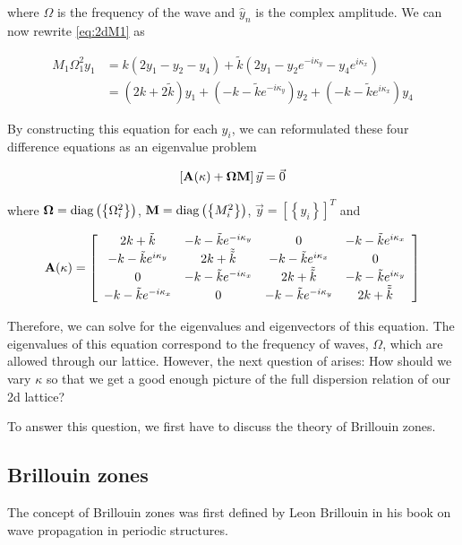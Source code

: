 where $\Omega$ is the frequency of the wave and $\hat{y}_{n}$ is the complex
amplitude. We can now rewrite \eqref{eq:2dM1} as

\begin{align}
  M_1\Omega_1^{2}y_1
      &=k\left(2y_1-y_2-y_4\right)+
       \tilde{k}\left(2y_1-y_{2}e^{-i\kappa_y}-y_{4}e^{i\kappa_x}\right) \\
      &=\left(2k+2\tilde{k}\right)y_1+\left(-k-\tilde{k}e^{-i\kappa_y}\right)y_2+
       \left(-k-\tilde{k}e^{i\kappa_x}\right)y_4
\end{align}

By constructing this equation for each $y_i$, we can reformulated these four
difference equations as an eigenvalue problem

\begin{align}
  \left[\mathbf{A(\kappa)}+\mathbf{\Omega}\mathbf{M}\right]\vec{y}=\vec{0}
\end{align}

where $\mathbf{\Omega}=\operatorname{diag}\left(\left\{\Omega_i^2\right\}\right)$,
$\mathbf{M}=\operatorname{diag}\left(\left\{M_i^2\right\}\right)$,
$\vec{y}=\left[\left\{y_i\right\}\right]^T$ and

\begin{align}
  \mathbf{A(\kappa)}=\left[
\begin{array}{cccc}
2k+\tilde{k} & -k-\tilde{k}e^{-i\kappa_{y}} & 0 & -k-\tilde{k}e^{i\kappa_{x}}\\
-k-\tilde{k}e^{i\kappa_{y}} & 2k+\tilde{\tilde{k}} & -k-\tilde{k}e^{i\kappa_{x}} & 0\\
0 & -k-\tilde{k}e^{-i\kappa_{x}} & 2k+\tilde{\tilde{k}} & -k-\tilde{k}e^{i\kappa_{y}}\\
-k-\tilde{k}e^{-i\kappa_{x}} & 0 & -k-\tilde{k}e^{-i\kappa_{y}} & 2k+\tilde{\tilde{k}}
\end{array}\right]
\end{align}

Therefore, we can solve for the eigenvalues and eigenvectors of this equation.
The eigenvalues of this equation correspond to the frequency of waves,
$\Omega$, which are allowed through our lattice. However, the next question of
arises: How should we vary $\kappa$ so that we get a good enough picture of the
full dispersion relation of our 2d lattice?

To answer this question, we first have to discuss the theory of Brillouin zones.

\subsection{Brillouin zones}
\label{brizones}
The concept of Brillouin zones was first defined by Leon Brillouin in his book
on wave propagation in periodic structures.\cite{brillouin}

